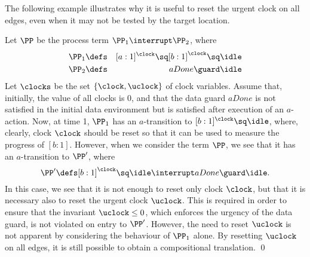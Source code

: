 The following example illustrates why it is useful to reset the
urgent clock on all edges, even when it may not be tested by the target
location.
\begin{exampleb}
Let $\PP$ be the process term $\PP_1 \interrupt \PP_2$, where
\begin{eqnarray*}
\PP_1 & \defs & [a:1]^\clock \sq [b:1]^\clock \sq \idle \\
\PP_2 & \defs & aDone \guard \idle \\
\end{eqnarray*}
Let $\clocks$ be the set $\{\clock,\uclock\}$ of clock variables. Assume that,
initially, the value of all clocks is $0$, and that the data guard
$aDone$ is not satisfied in the initial data environment but is satisfied
after execution of an $a$-action. Now, at time 1, $\PP_1$ has an
$a$-transition to $[b:1]^\clock \sq \idle$, where, clearly, clock $\clock$
should be reset so that it can be used to measure the progress of $[b:1]$.
However, when we consider the term $\PP$, we see that it has an
$a$-transition to $\PP'$, where 
\[ \PP' \defs [b:1]^\clock \sq \idle \interrupt aDone \guard \idle.\]
In this case, we see that it is not enough to reset only clock $\clock$,
but that it is necessary also to reset the urgent clock $\uclock$.
This is required in order to ensure that the 
invariant $\uclock \leq 0$, which enforces the urgency of the data guard,
is not violated on entry to $\PP'$. However, the need to reset $\uclock$ is not
apparent by considering the behaviour of $\PP_1$ alone. By resetting $\uclock$
on all edges, it is still possible to obtain a compositional translation.
\qed
\end{exampleb}

